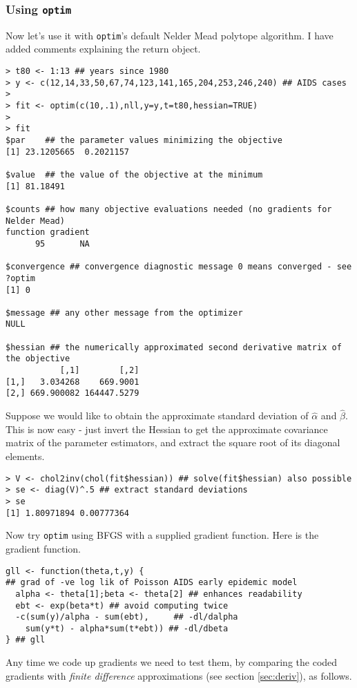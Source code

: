 \documentclass[10pt] {article}
\theoremstyle{definition}
\begin{document}
\subsubsection{Using {\tt optim}}
Now let's use it with {\tt optim}'s default Nelder Mead polytope algorithm. I have added comments explaining the return object.
\begin{lstlisting}
> t80 <- 1:13 ## years since 1980
> y <- c(12,14,33,50,67,74,123,141,165,204,253,246,240) ## AIDS cases
> 
> fit <- optim(c(10,.1),nll,y=y,t=t80,hessian=TRUE)
> 
> fit 
$par    ## the parameter values minimizing the objective
[1] 23.1205665  0.2021157

$value  ## the value of the objective at the minimum
[1] 81.18491

$counts ## how many objective evaluations needed (no gradients for Nelder Mead)
function gradient 
      95       NA 

$convergence ## convergence diagnostic message 0 means converged - see ?optim
[1] 0

$message ## any other message from the optimizer
NULL

$hessian ## the numerically approximated second derivative matrix of the objective
           [,1]        [,2]
[1,]   3.034268    669.9001
[2,] 669.900082 164447.5279
\end{lstlisting} 
Suppose we would like to obtain the approximate standard deviation of $\hat \alpha$ and $\hat \beta$. This is now easy - just invert the Hessian to get the approximate covariance matrix of the parameter estimators, and extract the square root of its diagonal elements.
\begin{lstlisting}
> V <- chol2inv(chol(fit$hessian)) ## solve(fit$hessian) also possible
> se <- diag(V)^.5 ## extract standard deviations
> se
[1] 1.80971894 0.00777364
\end{lstlisting}
Now try {\tt optim} using BFGS with a supplied gradient function. Here is the gradient function.
\begin{lstlisting}
gll <- function(theta,t,y) {
## grad of -ve log lik of Poisson AIDS early epidemic model
  alpha <- theta[1];beta <- theta[2] ## enhances readability
  ebt <- exp(beta*t) ## avoid computing twice
  -c(sum(y)/alpha - sum(ebt),     ## -dl/dalpha
    sum(y*t) - alpha*sum(t*ebt)) ## -dl/dbeta
} ## gll
\end{lstlisting}
Any time we code up gradients we need to test them, by comparing the coded gradients with {\em finite difference} approximations (see section \ref{sec:deriv}), as follows. 
\end{document}

